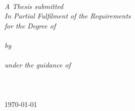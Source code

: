 \documentclass[11pt, a4paper, oneside]{Thesis} %
\begin{document}
\begin{titlepage}
\begin{center}


\HRule \\[0.4cm] %
{\huge \bfseries \ttitle}\\[0.4cm] %
\HRule \\[1.5cm] %
 
 
\large \textit{A Thesis submitted \\In Partial Fulfilment of the Requirements\\for the Degree of \\ \textsc{\degreename}}\\[0.3cm] %
\textit{by}\\[0.4cm]
{\authornames}\\
{\textit{under the guidance of }\\\supname}\\[1.5cm]
\textbf{\deptname \\ \univname}\\[2cm] %
 
{\large \today}\\[4cm] %
 
\vfill
\end{center}

\end{titlepage}
\end{document}
